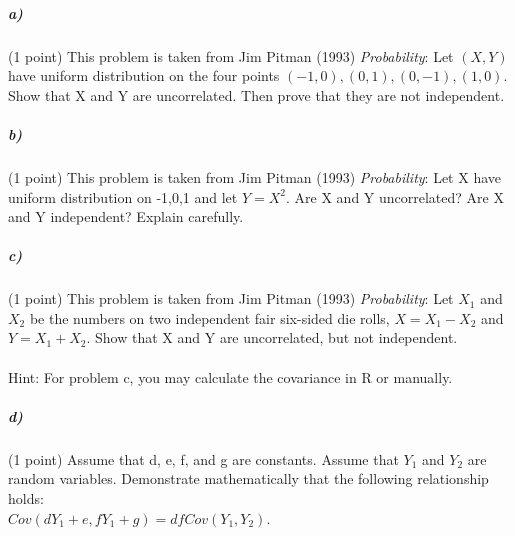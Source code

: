 \documentclass[12pt,letter]{article}
\begin{document}
\subparagraph{a)} (1 point) This problem is taken from Jim Pitman (1993) \textit{Probability}: Let $(X,Y)$ have uniform distribution on the four points $(-1,0), (0,1), (0,-1), (1,0)$. Show that X and Y are uncorrelated. Then prove that they are not independent. %

\subparagraph{b)} (1 point) This problem is taken from Jim Pitman (1993) \textit{Probability}: Let X have uniform distribution on {-1,0,1} and let $Y=X^2$. Are X and Y uncorrelated? Are X and Y independent? Explain carefully. %

\subparagraph{c)} (1 point) This problem is taken from Jim Pitman (1993) \textit{Probability}: Let $X_{1}$ and $X_{2} $ be the numbers on two independent fair six-sided die rolls, $X = X_{1} - X_{2}$ and $Y= X_{1} + X_{2}$. Show that X and Y are uncorrelated, but not independent. %

\paragraph{} Hint: For problem c, you may calculate the covariance in R or manually.

\subparagraph{d)} (1 point) Assume that d, e, f, and g are constants. Assume that $Y_1$ and $Y_2$ are random variables. Demonstrate mathematically that the following relationship holds: \\
$Cov(dY_1 + e, fY_1 + g) = df Cov(Y_1, Y_2)$.
\end{document}
